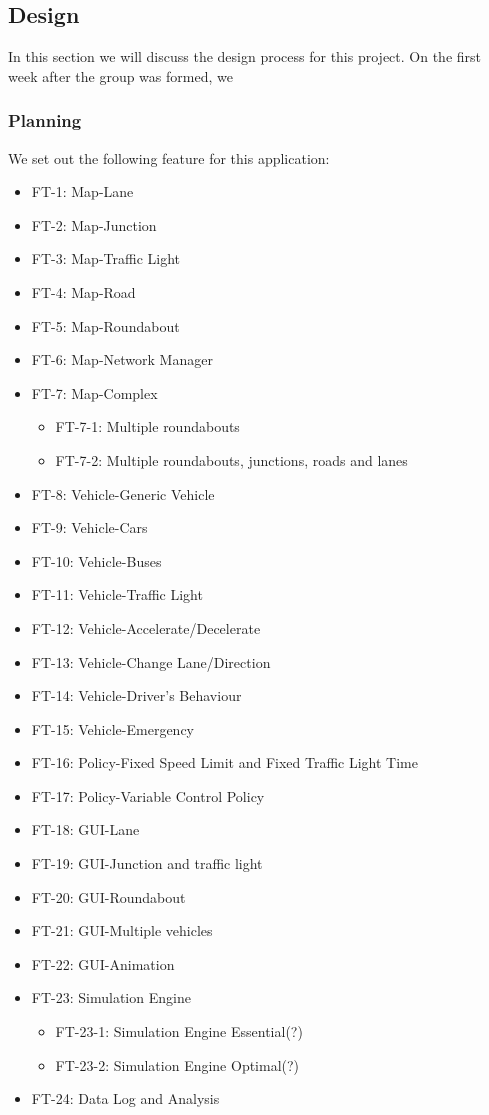 \documentclass[11pt]{article}
\begin{document}
\subsection{Design}
In this section we will discuss the design process for this project. On the first week after the group was formed, we 

    \subsubsection{Planning}
    We set out the following feature for this application:
    
    \begin{itemize}[noitemsep]
    	\item FT-1: Map-Lane
    	\item FT-2: Map-Junction
    	\item FT-3: Map-Traffic Light
    	\item FT-4: Map-Road
    	\item FT-5: Map-Roundabout
    	\item FT-6: Map-Network Manager
    	\item FT-7: Map-Complex
    		\begin{itemize}
        	\item FT-7-1: Multiple roundabouts
        	\item FT-7-2: Multiple roundabouts, junctions, roads and lanes
        	\end{itemize}
    	\item FT-8: Vehicle-Generic Vehicle
    	\item FT-9: Vehicle-Cars
    	\item FT-10: Vehicle-Buses
    	\item FT-11: Vehicle-Traffic Light
    	\item FT-12: Vehicle-Accelerate/Decelerate
    	\item FT-13: Vehicle-Change Lane/Direction
    	\item FT-14: Vehicle-Driver's Behaviour
    	\item FT-15: Vehicle-Emergency
    	\item FT-16: Policy-Fixed Speed Limit and Fixed Traffic Light Time
    	\item FT-17: Policy-Variable Control Policy
    	\item FT-18: GUI-Lane
    	\item FT-19: GUI-Junction and traffic light
    	\item FT-20: GUI-Roundabout
    	\item FT-21: GUI-Multiple vehicles
    	\item FT-22: GUI-Animation
    	\item FT-23: Simulation Engine
    	    \begin{itemize}
        	\item FT-23-1: Simulation Engine Essential(?)
        	\item FT-23-2: Simulation Engine Optimal(?)
        	\end{itemize}
    	\item FT-24: Data Log and Analysis
   \end{itemize}
\end{document}
